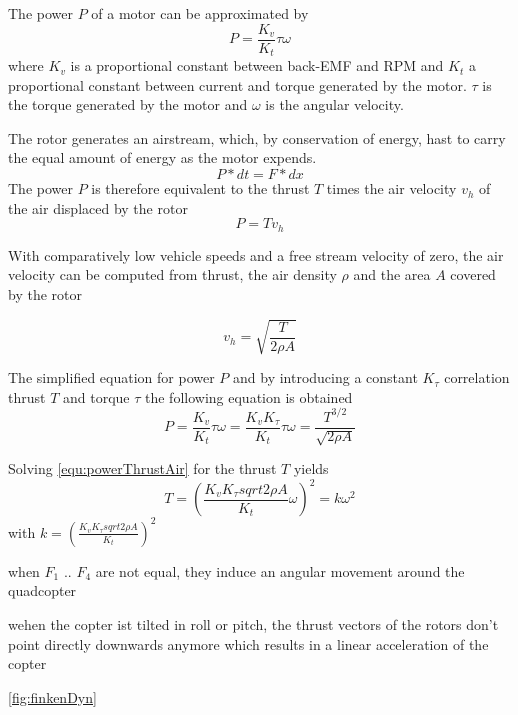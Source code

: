 The power $P$ of a motor can be approximated by
\begin{equation}
P = \frac{K_v}{K_t} \tau \omega
\end{equation}
where $K_v$ is a proportional constant between back-EMF and RPM and $K_t$ a proportional constant between current and torque generated by the motor. $\tau$ is the torque generated by the motor and $\omega$ is the angular velocity.

\cite{gibansky}

The rotor generates an airstream, which, by conservation of energy, hast to carry the equal amount of energy as the motor expends. 
\begin{equation}
P * dt = F* d x
\end{equation}
The power $P$ is therefore equivalent to the thrust $T$ times the air velocity $v_h$ of the air displaced by the rotor
\begin{equation}
P = T v_h
\end{equation}

With comparatively low vehicle speeds and a free stream velocity of zero, the air velocity can be computed from thrust, the air density $\rho$ and the area $A$ covered by the rotor

\begin{equation}
v_h = \sqrt{\frac{T}{2\rho A}}
\end{equation}

The simplified equation for power $P$ and by introducing a constant $K_\tau$ correlation thrust $T$ and torque $\tau$ the following equation is obtained
\begin{equation}
P = \frac{K_v}{K_t} \tau \omega  = \frac{K_v K_\tau}{K_t} \tau \omega = \frac{T^{3/2}}{\sqrt{2\rho A}}
\label{equ:powerThrustAir}
\end{equation}

Solving \ref{equ:powerThrustAir} for the thrust $T$ yields 
\begin{equation}
T = (\frac{K_v K_\tau sqrt{2 \rho A}}{K_t}\omega)^2 = k\omega^2
\end{equation}
with $k = (\frac{K_v K_\tau sqrt{2 \rho A}}{K_t})^2$

\par{when $F_1$ .. $F_4$ are not equal, they induce an angular movement around the quadcopter}
\par{wehen the copter ist tilted in roll or pitch, the thrust vectors of the rotors don't point directly downwards anymore which results in a linear acceleration of the copter}
\par{\ref{fig:finkenDyn}  }

